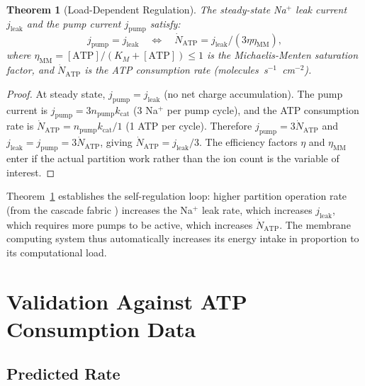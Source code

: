 \documentclass[11pt,twocolumn,a4paper]{article}
\newtheorem{theorem}{Theorem}[section]
\theoremstyle{definition}
\theoremstyle{remark}
\begin{document}
\begin{theorem}[Load-Dependent Regulation]
\label{thm:loaddep}
The steady-state Na$^+$ leak current $j_{\mathrm{leak}}$ and the pump current
$j_{\mathrm{pump}}$ satisfy:
\begin{equation}
j_{\mathrm{pump}} = j_{\mathrm{leak}} \quad \Leftrightarrow \quad
\dot{N}_{\mathrm{ATP}} = j_{\mathrm{leak}} / (3\eta \eta_{\mathrm{MM}}),
\label{eq:regulation}
\end{equation}
where $\eta_{\mathrm{MM}} = [\mathrm{ATP}] / (K_M + [\mathrm{ATP}]) \leq 1$
is the Michaelis-Menten saturation factor, and $\dot{N}_{\mathrm{ATP}}$
is the ATP consumption rate (molecules~s$^{-1}$~cm$^{-2}$).
\end{theorem}

\begin{proof}
At steady state, $j_{\mathrm{pump}} = j_{\mathrm{leak}}$ (no net charge accumulation).
The pump current is $j_{\mathrm{pump}} = 3 n_{\mathrm{pump}} k_{\mathrm{cat}}$
(3 Na$^+$ per pump cycle), and the ATP consumption rate is
$\dot{N}_{\mathrm{ATP}} = n_{\mathrm{pump}} k_{\mathrm{cat}} / 1$
(1 ATP per cycle). Therefore $j_{\mathrm{pump}} = 3 \dot{N}_{\mathrm{ATP}}$
and $j_{\mathrm{leak}} = j_{\mathrm{pump}} = 3 \dot{N}_{\mathrm{ATP}}$,
giving $\dot{N}_{\mathrm{ATP}} = j_{\mathrm{leak}} / 3$. The efficiency
factors $\eta$ and $\eta_{\mathrm{MM}}$ enter if the actual partition work
rather than the ion count is the variable of interest.
\end{proof}

Theorem~\ref{thm:loaddep} establishes the self-regulation loop: higher partition
operation rate (from the cascade fabric \citep{companion5}) increases the Na$^+$
leak rate, which increases $j_{\mathrm{leak}}$, which requires more pumps to
be active, which increases $\dot{N}_{\mathrm{ATP}}$. The membrane computing
system thus automatically increases its energy intake in proportion to its
computational load.

\section{Validation Against ATP Consumption Data}
\label{sec:validation}

\subsection{Predicted Rate}
\end{document}
